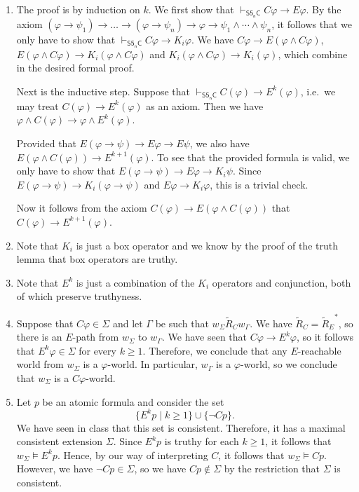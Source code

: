 \documentclass{article}
\newcommand{\sfivenc}{\mathsf{S5_nC}}
\begin{document}
\maketitle

\begin{ex}
\begin{enumerate}
\item The proof is by induction on $k$. We first show that $\vdash_{\sfivenc}C\varphi\to E\varphi$. 
By the axiom $(\varphi\to\psi_1)\to\ldots\to(\varphi\to\psi_n)\to\varphi\to\psi_1\land
\cdots\land\psi_n$, it follows that we only have to show that
$\vdash_{\sfivenc}C\varphi\to K_i\varphi$.
We have $C\varphi\to E(\varphi\land C\varphi)$, $E(\varphi\land C\varphi)\to
K_i(\varphi\land C\varphi)$ and $K_i(\varphi\land C\varphi)\to K_i(\varphi)$,
which combine in the desired formal proof.

Next is the inductive step. Suppose that
$\vdash_{\sfivenc}C(\varphi)\to E^k(\varphi)$, i.e.~we may treat $C(\varphi)
\to E^k(\varphi)$ as an axiom. Then we have $\varphi\land C(\varphi)\to
\varphi\land E^k(\varphi)$.

Provided that $E(\varphi\to\psi)\to E\varphi\to E\psi$, we also have $E(\varphi\land C(\varphi))\to
E^{k+1}(\varphi)$. To see that the provided formula is valid, we only have to
show that $E(\varphi\to\psi)\to E\varphi\to K_i\psi$. Since $E(\varphi\to\psi)\to
K_i(\varphi\to\psi)$ and $E\varphi\to K_i\varphi$, this is a trivial check.

Now it follows from the axiom
$C(\varphi)\to E(\varphi\land C(\varphi))$ that $C(\varphi)\to E^{k+1}(\varphi)$. 
\item Note that $K_i$ is just a box operator and we know by the proof of the
truth lemma that box operators are truthy.
\item Note that $E^k$ is just a combination of the $K_i$ operators and conjunction,
both of which preserve truthyness.
\item Suppose that $C\varphi\in\Sigma$ and let $\Gamma$ be such that
$w_\Sigma\mathbin{\tilde{R}_C} w_\Gamma$. We have $\tilde{R}_C={\tilde{R}_E}^*$,
so there is an $E$-path from $w_\Sigma$ to $w_\Gamma$. We have seen that
$C\varphi\to E^k\varphi$, so it follows that $E^k\varphi\in\Sigma$ for every
$k\geq1$. Therefore, we conclude that any $E$-reachable world from
$w_\Sigma$ is a $\varphi$-world. In particular, $w_\Gamma$ is a $\varphi$-world,
so we conclude that $w_\Sigma$ is a $C\varphi$-world.
\item Let $p$ be an atomic formula and consider the set
\begin{equation*}
\{E^kp\mid k\geq 1\}\cup\{\neg Cp\}.
\end{equation*}
We have seen in class that this set is consistent. Therefore, it has a maximal
consistent extension $\Sigma$. Since $E^kp$ is truthy for each $k\geq 1$,
it follows that $w_\Sigma\models E^kp$. Hence, by our way of interpreting
$C$, it follows that $w_\Sigma\models Cp$. However, we have $\neg Cp\in\Sigma$,
so we have $Cp\notin\Sigma$ by the restriction that $\Sigma$ is consistent.
\end{enumerate}
\end{ex}
\end{document}
